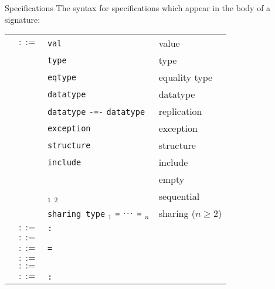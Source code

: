 \begin{grammar}{Specifications}
The syntax for specifications which appear in the body of a signature:
\begin{longtable}{rcll}
\label{grammar:spec}\nonterminal{spec} & $::=$ &
\texttt{val} \nonterminal{valdesc} & value\\
&\alt&\texttt{type} \nonterminal{typdesc} & type\\
&\alt&\texttt{eqtype} \nonterminal{typdesc} & equality type\\
&\alt&\texttt{datatype} \nonterminal{datdesc} & datatype\\
&\alt&\texttt{datatype} \nonterminal{tycon} \texttt{-=-}
\texttt{datatype} \nonterminal{longtycon} & replication\\
&\alt& \texttt{exception} \nonterminal{exdesc} & exception\\
&\alt& \texttt{structure} \nonterminal{strdesc} & structure\\
&\alt& \texttt{include} \nonterminal{sigexp} & include\\
&\alt& & empty\\
&\alt& \nonterminal{spec}$_{1}$ \optional{\texttt{;}} \nonterminal{spec}$_{2}$ & sequential\\
&\alt&\nonterminal{spec} \texttt{sharing type}
\nonterminal{longtycon}$_{1}$ \texttt{=} $\mathinner{{}^{\textstyle .\,.\,.}}$ \texttt{=} \nonterminal{longtycon}$_{n}$
& sharing ($n\geq2$)\\
\label{grammar:valdesc}\nonterminal{valdesc} & $::=$ &
\nonterminal{vid} \texttt{:} \nonterminal{ty} \optional{\texttt{and} \nonterminal{valdesc}} & \\
\label{grammar:typdesc}\nonterminal{typdesc} & $::=$ &
\nonterminal{tyvarseq} \nonterminal{tycon} \optional{\texttt{and} \nonterminal{typdesc}} & \\
\label{grammar:datdesc}\nonterminal{datdesc} & $::=$ & \nonterminal{tyvarseq} \nonterminal{tycon} \texttt{=} \nonterminal{condesc} \optional{\texttt{and} \nonterminal{datdesc}} & \\
\label{grammar:condesc}\nonterminal{condesc} & $::=$ & \nonterminal{vid} \optional{\texttt{of} \nonterminal{ty}} \optional{\texttt{\char`\|} \nonterminal{condesc}} & \\
\label{grammar:exdesc}\nonterminal{exdesc} & $::=$ & \nonterminal{vid} \optional{\texttt{of} \nonterminal{ty}}
\optional{\texttt{\char`\|} \nonterminal{exdesc}} & \\
\label{grammar:strdesc}\nonterminal{strdesc} & $::=$ & \nonterminal{strid} \texttt{:} \nonterminal{sigexp} \optional{\texttt{and} \nonterminal{strdesc}} & \\
\end{longtable}
\end{grammar}

